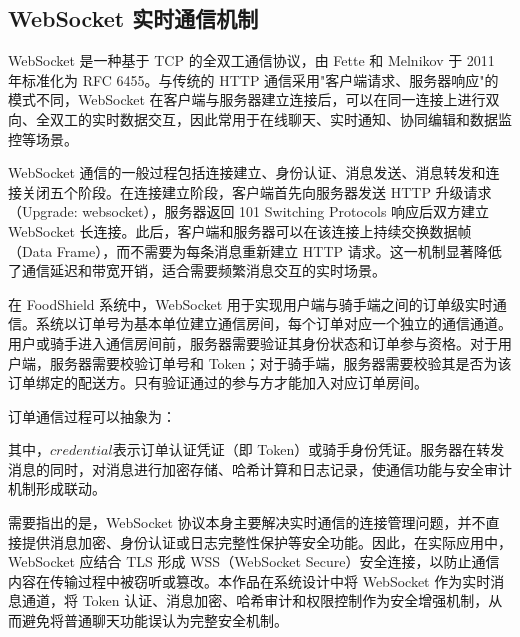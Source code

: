 \subsection{WebSocket 实时通信机制}

WebSocket 是一种基于 TCP 的全双工通信协议，由 Fette 和 Melnikov 于 2011 年标准化为 RFC 6455\cite{rfc6455}。与传统的 HTTP 通信采用"客户端请求、服务器响应"的模式不同，WebSocket 在客户端与服务器建立连接后，可以在同一连接上进行双向、全双工的实时数据交互，因此常用于在线聊天、实时通知、协同编辑和数据监控等场景。

WebSocket 通信的一般过程包括连接建立、身份认证、消息发送、消息转发和连接关闭五个阶段。在连接建立阶段，客户端首先向服务器发送 HTTP 升级请求（Upgrade: websocket），服务器返回 101 Switching Protocols 响应后双方建立 WebSocket 长连接。此后，客户端和服务器可以在该连接上持续交换数据帧（Data Frame），而不需要为每条消息重新建立 HTTP 请求。这一机制显著降低了通信延迟和带宽开销，适合需要频繁消息交互的实时场景。

在 FoodShield 系统中，WebSocket 用于实现用户端与骑手端之间的订单级实时通信。系统以订单号为基本单位建立通信房间，每个订单对应一个独立的通信通道。用户或骑手进入通信房间前，服务器需要验证其身份状态和订单参与资格。对于用户端，服务器需要校验订单号和 Token；对于骑手端，服务器需要校验其是否为该订单绑定的配送方。只有验证通过的参与方才能加入对应订单房间。

订单通信过程可以抽象为：



其中，$\mathit{credential}$表示订单认证凭证（即 Token）或骑手身份凭证。服务器在转发消息的同时，对消息进行加密存储、哈希计算和日志记录，使通信功能与安全审计机制形成联动。



需要指出的是，WebSocket 协议本身主要解决实时通信的连接管理问题，并不直接提供消息加密、身份认证或日志完整性保护等安全功能。因此，在实际应用中，WebSocket 应结合 TLS 形成 WSS（WebSocket Secure）安全连接，以防止通信内容在传输过程中被窃听或篡改。本作品在系统设计中将 WebSocket 作为实时消息通道，将 Token 认证、消息加密、哈希审计和权限控制作为安全增强机制，从而避免将普通聊天功能误认为完整安全机制。
